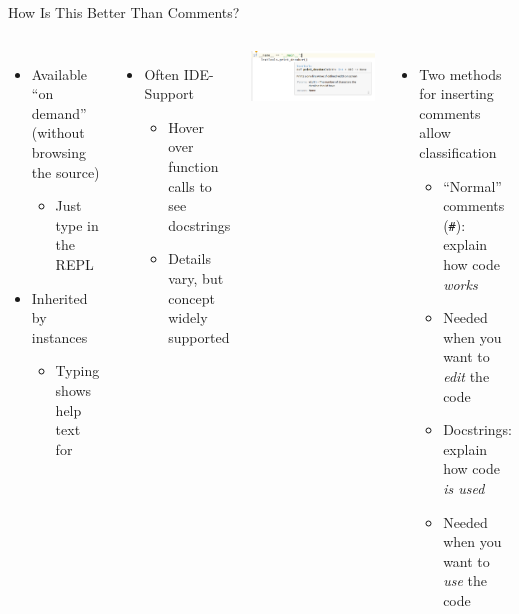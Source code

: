 \begin{frame}{How Is This Better Than Comments?}
%
\begin{columns}[T]
\begin{itemize}
\item Available \enquote{on demand} (without browsing the source)
	\begin{itemize}
	\item Just type  in the REPL
	\end{itemize}
\item Inherited by instances
	\begin{itemize}
	\item Typing  shows help text for 
	\end{itemize}
\end{itemize}
%
\begin{itemize}
\item Often IDE-Support
	\begin{itemize}
	\item Hover over function calls to see docstrings
	\item Details vary, but concept widely supported
	\end{itemize}
\end{itemize}
\includegraphics[width=\linewidth]{./gfx/09-helptext-mouseover}
%
\begin{itemize}
\item Two methods for inserting comments allow classification
	\begin{itemize}
	\item \enquote{Normal} comments (\texttt{\#}): explain how code \emph{works}
	\item[\Thus] Needed when you want to \emph{edit} the code
	\item Docstrings: explain how code \emph{is used}
	\item[\Thus] Needed when you want to \emph{use} the code
	\end{itemize}
\end{itemize}
\end{columns}
%
\end{frame}

